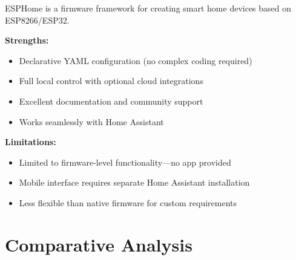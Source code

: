 ESPHome is a firmware framework for creating smart home devices based on ESP8266/ESP32.

\textbf{Strengths:}
\begin{itemize}
    \item Declarative YAML configuration (no complex coding required)
    \item Full local control with optional cloud integrations
    \item Excellent documentation and community support
    \item Works seamlessly with Home Assistant
\end{itemize}

\textbf{Limitations:}
\begin{itemize}
    \item Limited to firmware-level functionality—no app provided
    \item Mobile interface requires separate Home Assistant installation
    \item Less flexible than native firmware for custom requirements
\end{itemize}

\section{Comparative Analysis}

\begin{table}[H]
\centering
\caption{Comparison of Smart Home Automation Systems}
\label{tbl:comparison}
\end{table}

